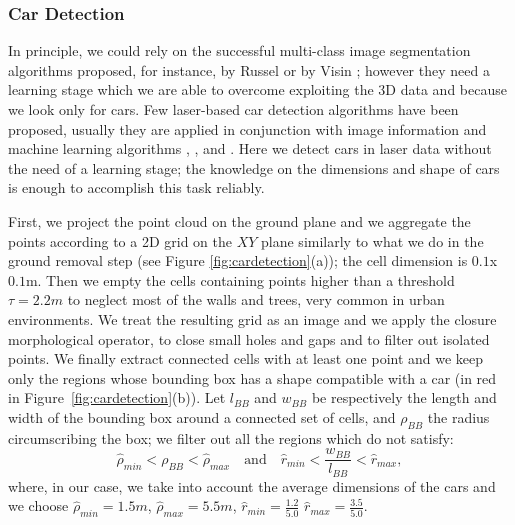 \subsubsection{Car Detection}
In principle, we could rely on the successful multi-class image segmentation algorithms proposed, for instance, by Russel \etal \cite{russell2009associative} or by Visin \etal \cite{visin2016reseg}; however they need a learning stage which we are able to overcome exploiting the 3D data and because we look only for cars.
Few laser-based car detection algorithms have been proposed, usually they are applied in conjunction with image information and machine learning algorithms \cite{wender20083d}, \cite{zhang2014vehicle}, and \cite{premebida2007lidar}.
Here we detect cars in laser data without the need of a learning stage; the knowledge on the dimensions and shape of cars is enough to accomplish this task reliably.

First, we project the point cloud on the ground plane and we aggregate the points according to a 2D grid on the $XY$ plane similarly to what we do in the ground removal step (see Figure \ref{fig:cardetection}(a)); the cell dimension is $0.1$x$0.1$m.
Then we empty the cells containing points higher than a threshold $\tau=2.2m$ to neglect most of the walls and trees, very common in urban environments.
We treat the resulting grid as an image and we apply the closure morphological operator, to close small holes and gaps and to filter out isolated points.
We finally extract connected cells with at least one point and we keep only the regions whose bounding box has a shape compatible with a car (in red in Figure~\ref{fig:cardetection}(b)). 
Let $l_{BB}$ and $w_{BB}$ be respectively the length and width of the bounding box around a connected set of cells, and $\rho_{BB}$ the radius circumscribing the box; we filter out all the regions which do not satisfy:
\begin{equation}
 \hat{\rho}_{min} < \rho_{BB} < \hat{\rho}_{max} \quad \text{and} \quad  \hat{r}_{min} < \frac{w_{BB}}{l_{BB}}< \hat{r}_{max},
\end{equation}
where, in our case, we take into account the average dimensions of the cars and we choose $\hat{\rho}_{min} = 1.5m$, $\hat{\rho}_{max}=5.5m$,  $\hat{r}_{min} =\frac{1.2}{5.0}$ $\hat{r}_{max} = \frac{3.5}{5.0}$.

